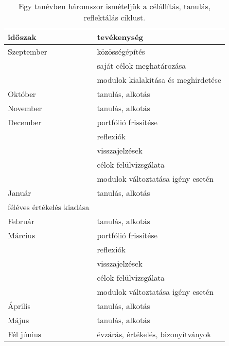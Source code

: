 \begin{table}
  \centering
  \begin{tabular}{ l|l }
    \textbf{időszak} & \textbf{tevékenység}                \\
    \hline
    Szeptember       &
    közösségépítés                                         \\
                     & saját célok meghatározása           \\
                     & modulok kialakítása és meghirdetése
    \\ \hline

    Október          &
    tanulás, alkotás
    \\ \hline

    November         &
    tanulás, alkotás
    \\ \hline

    December         &
    portfólió frissítése                                   \\
                     & reflexiók                           \\
                     & visszajelzések                      \\
                     & célok felülvizsgálata               \\
                     & modulok változtatása igény esetén
    \\ \hline

    Január           &
    tanulás, alkotás                                       \\
    féléves értékelés kiadása
    \\ \hline

    Február          &
    tanulás, alkotás
    \\ \hline

    Március          &
    portfólió frissítése                                   \\
                     & reflexiók                           \\
                     & visszajelzések                      \\
                     & célok felülvizsgálata               \\
                     & modulok változtatása igény esetén
    \\ \hline

    Április          &
    tanulás, alkotás
    \\ \hline

    Május            &
    tanulás, alkotás
    \\ \hline

    Fél június       &
    évzárás, értékelés, bizonyítványok
  \end{tabular}
  \caption{Egy tanévben háromszor ismételjük a célállítás, tanulás, reflektálás ciklust.}
  \label{tbl:tanevritmus}
\end{table}

